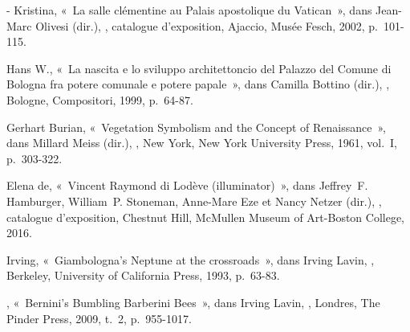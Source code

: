 \begin{teiElement}[name={TEI},change={commons\_edition}]
\begin{teiElement}[name={text},type={book},xmlid={book}]
\begin{teiElement}[name={group},type={book},xmlid={book-001}]
\begin{teiElement}[name={group},type={bibliography},data-page-title={Sources et bibliographie},data-include-href={Ch14\_Source\_bibliographie.xml},xmlid={bibliography-001}]
\begin{teiElement}[name={body}]
\begin{teiDiv}[type={section1},xmlid={div18}]
\begin{teiDiv}[type={section2},xmlid={div19}]
\begin{teiBibl}[xmlid={bibl-384}]
\end{teiBibl}
              \begin{teiBibl}[xmlid={bibl-385}]
- Kristina, « La salle clémentine au Palais apostolique du Vatican », dans Jean-Marc Olivesi (dir.), , catalogue d’exposition, Ajaccio, Musée Fesch, 2002, p. 101-115.
\end{teiBibl}
              \begin{teiBibl}[xmlid={bibl-386}]
 Hans W., « La nascita e lo sviluppo architettoncio del Palazzo del Comune di Bologna fra potere comunale e potere papale », dans Camilla Bottino (dir.), , Bologne, Compositori, 1999, p. 64-87.
\end{teiBibl}
              \begin{teiBibl}[xmlid={bibl-387}]
 Gerhart Burian, « Vegetation Symbolism and the Concept of Renaissance », dans Millard Meiss (dir.), , New York, New York University Press, 1961, vol. I, p. 303-322. 
\end{teiBibl}
              \begin{teiBibl}[xmlid={bibl-388}]
 Elena de, « Vincent Raymond di Lodève (illuminator) », dans Jeffrey F. Hamburger, William P. Stoneman, Anne-Mare Eze et Nancy Netzer (dir.), , catalogue d’exposition, Chestnut Hill, McMullen Museum of Art-Boston College, 2016.
\end{teiBibl}
              \begin{teiBibl}[xmlid={bibl-389}]
 Irving, « Giambologna’s Neptune at the crossroads », dans Irving Lavin, , Berkeley, University of California Press, 1993, p. 63-83.
\end{teiBibl}
              \begin{teiBibl}[xmlid={bibl-390}]
, « Bernini’s Bumbling Barberini Bees », dans Irving Lavin, , Londres, The Pinder Press, 2009, t. 2, p. 955-1017.

\end{teiBibl}
\end{teiDiv}
\end{teiDiv}
\end{teiElement}
\end{teiElement}
\end{teiElement}
\end{teiElement}
\end{teiElement}

